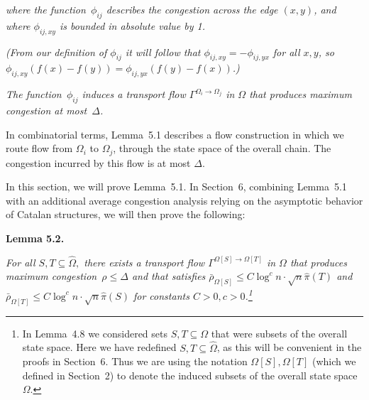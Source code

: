 \documentclass[10pt,a4paper]{article}
\begin{document}
\emph{where the function $\phi_{ij}$ describes the congestion across the edge $(x,y)$, and where $\phi_{ij,xy}$ is bounded in absolute value by 1.}\par




\emph{(From our definition of $\phi_{ij}$ it will follow that $\phi_{ij,xy}=-\phi_{ij,yx}$ for all $x,y$, so $\phi_{ij,xy}(f(x)-f(y))=\phi_{ij,yx}(f(y)-f(x))$.)}\par




\emph{The function $\phi_{ij}$ induces a
transport flow $\Gamma^{\Omega_{i}\rightarrow\Omega_{j}}$ in $\Omega$ that produces maximum congestion at most $\Delta$.}\par






In combinatorial terms, Lemma 5.1 describes a flow construction in which we route flow from $\Omega_{i}$ to $\Omega_{j}$, through the state space of the overall chain. The congestion incurred by this flow is at most $\Delta$.\par




In this section, we will prove Lemma 5.1. In Section 6, combining Lemma 5.1 with an additional average congestion analysis relying on the asymptotic behavior of Catalan structures, we will then prove the following:\par





\par\medskip\noindent\textbf{\textbf{Lemma 5.2}\textbf{.}}\par



{\itshape For all $S,T\subseteq\hat{\Omega},$ there exists a transport flow $\Gamma^{\Omega[S]\rightarrow\Omega[T]}$ in $\Omega$ that produces maximum congestion $\rho\leq\Delta$ and that satisfies $\bar{\rho}_{\Omega[S]}\leq C\log^{c}n\cdot\sqrt{n}\hat{\pi}(T)$ and $\bar{\rho}_{\Omega[T]}\leq C\log^{c}n\cdot\sqrt{n}\hat{\pi}(S)$ for constants $C>0,c>0$.\footnote{
                  
                  
                  
                  
                  
                  
                  
                  
                In Lemma 4.8 we considered sets $S,T\subseteq\Omega$ that were subsets of the overall state space. Here we have redefined $S,T\subseteq\hat{\Omega}$, as this will be convenient in the proofs in Section 6. Thus we are using the notation $\Omega[S],\Omega[T]$ (which we defined in Section 2) to denote the induced subsets of the overall state space $\Omega$.}}\par
\end{document}
